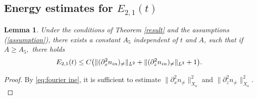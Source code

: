 \documentclass[12pt, reqno]{amsart}
\newtheorem{lemma}{Lemma}[section]
\numberwithin{equation}{section}
\begin{document}
	\subsection{Energy estimates for $E_{2,1}(t)$}
	\begin{lemma}\label{result_0_1}
		Under the conditions of Theorem \ref{result} and the assumptions (\ref{assumption}),
		there exists a constant $A_5$ independent of $t$ and $A$, such that
		if $A\geq A_5,$ there holds 
		$$E_{2,1}(t)\leq C\big(\|(\partial_x^2n_{\rm in})_{\neq}\|_{L^2}
		+\|(\partial_z^2n_{\rm in})_{\neq}\|_{L^2}+1\big).$$
	\end{lemma}
	\begin{proof} 
		By \eqref{eq:fourier ine}, it is sufficient  to estimate 
		$\|\partial_x^2n_{\neq}\|^2_{X_a}$ and $\|\partial_z^2n_{\neq}\|^2_{X_a}.$
		

\end{proof}
\end{document}
